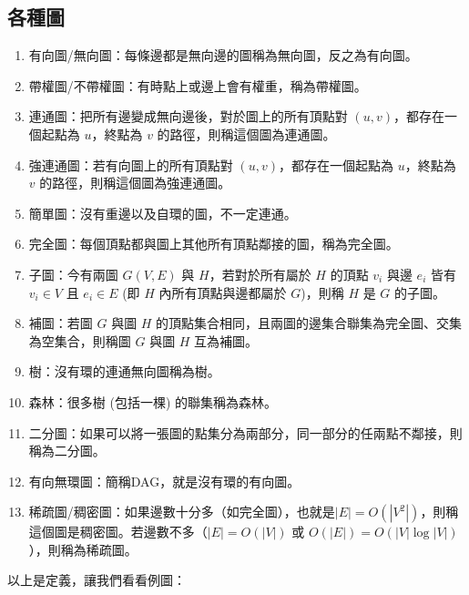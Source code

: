 \subsection{各種圖}
\begin{enumerate}
\item 有向圖/無向圖：每條邊都是無向邊的圖稱為無向圖，反之為有向圖。
\item 帶權圖/不帶權圖：有時點上或邊上會有權重，稱為帶權圖。
\item 連通圖：把所有邊變成無向邊後，對於圖上的所有頂點對 $(u, v)$，都存在一個起點為 $u$，終點為 $v$ 的路徑，則稱這個圖為連通圖。
\item 強連通圖：若有向圖上的所有頂點對 $(u, v)$，都存在一個起點為 $u$，終點為 $v$ 的路徑，則稱這個圖為強連通圖。
\item 簡單圖：沒有重邊以及自環的圖，不一定連通。
\item 完全圖：每個頂點都與圖上其他所有頂點鄰接的圖，稱為完全圖。
\item 子圖：今有兩圖 $G(V, E)$ 與 $H$，若對於所有屬於 $H$ 的頂點 $v_i$ 與邊 $e_i$ 皆有 $v_i \in V$ 且 $e_i \in E$ (即 $H$ 內所有頂點與邊都屬於 $G$)，則稱 $H$ 是 $G$ 的子圖。
\item 補圖：若圖 $G$ 與圖 $H$ 的頂點集合相同，且兩圖的邊集合聯集為完全圖、交集為空集合，則稱圖 $G$ 與圖 $H$ 互為補圖。
\item 樹：沒有環的連通無向圖稱為樹。
\item 森林：很多樹 (包括一棵) 的聯集稱為森林。
\item 二分圖：如果可以將一張圖的點集分為兩部分，同一部分的任兩點不鄰接，則稱為二分圖。
\item 有向無環圖：簡稱DAG，就是沒有環的有向圖。
\item 稀疏圖/稠密圖：如果邊數十分多（如完全圖），也就是$|E| = O(|V^2|)$，則稱這個圖是稠密圖。若邊數不多（$|E| = O(|V|)$ 或 $O(|E|) = O(|V|\log|V|)$），則稱為稀疏圖。
\end{enumerate}

\par 
以上是定義，讓我們看看例圖：

\begin{center}
\end{center}
 
